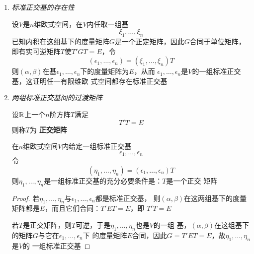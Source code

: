 \documentclass[11pt]{article}
\begin{document}
\begin{enumerate}
\item \emph{标准正交基的存在性}

设\(V\)是\(n\)维欧式空间，在\(V\)内任取一组基
\begin{equation*}
\xi_1,\dots,\xi_n
\end{equation*}
已知内积在这组基下的度量矩阵\(G\)是一个正定矩阵，因此\(G\)合同于单位矩阵，
即有实可逆矩阵\(T\)使\(T'GT=E\)，令
\begin{equation*}
(\epsilon_1,\dots,\epsilon_n)=(\xi_1,\dots,\xi_n)T
\end{equation*}
则\((\alpha,\beta)\)在基\(\epsilon_1,\dots,\epsilon_n\)下的度量矩阵为\(E\)，从而
\(\epsilon_1,\dots,\epsilon_n\)是\(V\)的一组标准正交基，这证明任一有限维欧
式空间都存在标准正交基

\item \emph{两组标准正交基间的过渡矩阵}
\begin{definition}[]
设\(\mathbb{R}\)上一个\(n\)阶方阵\(T\)满足
\begin{equation*}
T'T=E
\end{equation*}
则称\(T\)为 \textbf{正交矩阵}
\end{definition}

\begin{proposition}[]
在\(n\)维欧式空间\(V\)内给定一组标准正交基
\begin{equation*}
\epsilon_1,\dots,\epsilon_n
\end{equation*}
令
\begin{equation*}
(\eta_1,\dots,\eta_n)=(\epsilon_1,\dots,\epsilon_n)T
\end{equation*}
则\(\eta_1,\dots,\eta_n\)是一组标准正交基的充分必要条件是：\(T\)是一个正交
矩阵
\end{proposition}

\begin{proof}
若\(\eta_1,\dots,\eta_n\)与\(\epsilon_1,\dots,\epsilon_n\)都是标准正交基，
则\((\alpha,\beta)\)在这两组基下的度量矩阵都是\(E\)，而且它们合同：\(T'ET=E\)，即
\(T'T=E\)

若\(T\)是正交矩阵，则\(T\)可逆，于是\(\eta_1,\dots,\eta_n\)也是\(V\)的一组
基，\((\alpha,\beta)\)在这组基下的矩阵\(G\)与它在\(\epsilon_1,\dots,\epsilon_n\)下
的度量矩阵\(E\)合同，因此\(G=T'ET=E\)，故\(\eta_1,\dots,\eta_n\)是\(V\)的
一组标准正交基 
\end{proof}
\end{enumerate}
\end{document}
